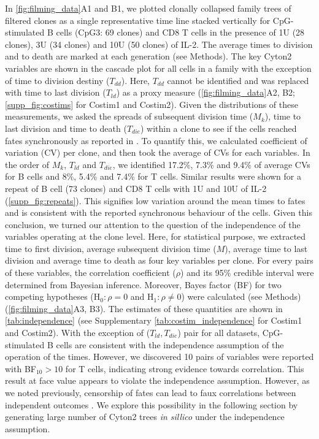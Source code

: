 \documentclass[11pt, a4paper]{article}
\begin{document}
\noindent
In \cref{fig:filming_data}A1 and B1, we plotted clonally collapsed family trees of filtered clones as a single representative time line stacked vertically for CpG-stimulated B cells (CpG3: 69 clones) and CD8 T cells in the presence of 1U (28 clones), 3U (34 clones) and 10U (50 clones) of IL-2. The average times to division and to death are marked at each generation (see Methods). The key Cyton2 variables are shown in the cascade plot for all cells in a family with the exception of time to division destiny ($T_{dd}$). Here, $T_{dd}$ cannot be identified and was replaced with time to last division ($T_{ld}$) as a proxy measure (\cref{fig:filming_data}A2, B2; \cref{supp_fig:costims} for Costim1 and Costim2). Given the distributions of these measurements, we asked the spreads of subsequent division time ($M_k$), time to last division and time to death ($T_{die}$) within a clone to see if the cells reached fates synchronously as reported in \cite{Hawkins.2009, Marchingo.2016, Mitchell.2018}. To quantify this, we calculated coefficient of variation (CV) per clone, and then took the average of CVs for each variables. In the order of $M_k$, $T_{ld}$ and $T_{die}$, we identified 17.2\%, 7.3\% and 9.4\% of average CVs for B cells and 8\%, 5.4\% and 7.4\% for T cells. Similar results were shown for a repeat of B cell (73 clones) and CD8 T cells with 1U and 10U of IL-2 (\cref{supp_fig:repeats}). This signifies low variation around the mean times to fates and is consistent with the reported synchronous behaviour of the cells. Given this conclusion, we turned our attention to the question of the independence of the variables operating at the clone level. Here, for statistical purpose, we extracted time to first division, average subsequent division time ($M$), average time to last division and average time to death as four key variables per clone. For every pairs of these variables, the correlation coefficient ($\rho$) and its 95\% credible interval were determined from Bayesian inference. Moreover, Bayes factor (BF) for two competing hypotheses (H$_0: \rho = 0$ and H$_1: \rho \neq 0$) were calculated (see Methods) (\cref{fig:filming_data}A3, B3). The estimates of these quantities are shown in \cref{tab:independence} (see Supplementary \cref{tab:costim_independence} for Costim1 and Costim2). With the exception of ($T_{ld}, T_{die}$) pair for all datasets, CpG-stimulated B cells are consistent with the independence assumption of the operation of the times. However, we discovered 10 pairs of variables were reported with BF$_{10}>10$ for T cells, indicating strong evidence towards correlation. This result at face value appears to violate the independence assumption. However, as we noted previously, censorship of fates can lead to faux correlations between independent outcomes \parencite{Duffy.2012, Duffy.2012j67}. We explore this possibility in the following section by generating large number of Cyton2 trees \textit{in sillico} under the independence assumption.
\end{document}

